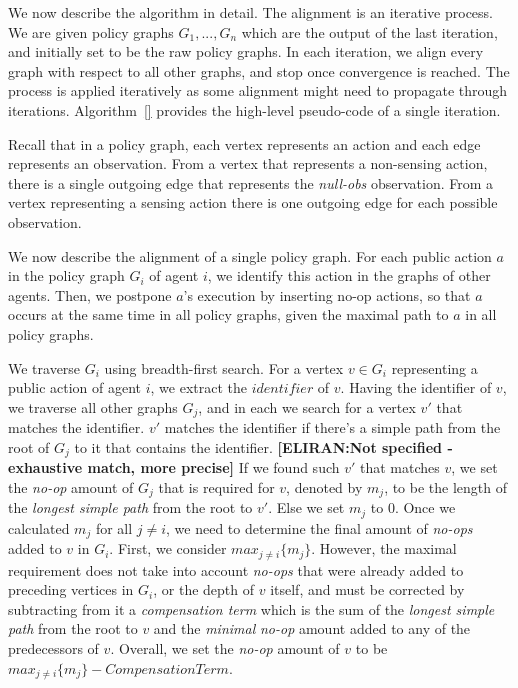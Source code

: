 \documentclass[letterpaper]{article} %
\theoremstyle{definition}
\newcommand{\eliran}[1]{\textbf{[\color{red}ELIRAN:#1]}}
\newcommand{\ronen}[1]{\textbf{[\color{blue}RONEN:#1]}}
\begin{document}
{We now describe the algorithm in detail.
The alignment is an iterative process. We are given policy graphs $G_1,...,G_n$ which are the output of the last iteration, and initially set to be the raw policy graphs. In each iteration, we align every graph with respect to all other graphs, and stop once convergence is reached. The process is applied iteratively as some alignment might need to propagate through iterations. Algorithm~\ref{} provides the high-level pseudo-code of a single iteration.

Recall that in a policy graph, each vertex represents an action and each edge represents an observation. From a vertex that represents a non-sensing action, there is a single outgoing edge that represents the \emph{null-obs} observation. From a vertex representing a sensing action there is one outgoing edge for each possible observation.

We now describe the alignment of a single policy graph. For each public action $a$ in the policy graph $G_i$ of agent $i$, we identify this action in the graphs of other agents.
Then, we postpone $a$'s execution by inserting no-op actions, so that $a$ occurs at the same time in all policy graphs, given the maximal path to $a$ in all policy graphs.

We traverse $G_i$ using breadth-first search. For a vertex $v\in G_i$ representing a public action of agent $i$, we extract the $identifier$ of $v$. Having the identifier of $v$, we traverse all other graphs $G_j$, and in each we search for a vertex $v'$ that matches the identifier. $v'$ matches the identifier if there's a simple path from the root of $G_j$ to it that contains the identifier.
\eliran{Not specified - exhaustive match, more precise}
If we found such $v'$ that matches $v$, we set the {\em no-op} amount of $G_j$ that is required for $v$, denoted by $m_j$, to be the length of the \emph{longest simple path} from the root to $v'$. Else we set $m_j$ to 0.
Once we calculated $m_j$ for all $j\neq i$, we need to determine the final amount of {\em no-ops} added to $v$ in $G_i$. First, we consider $max_{j\neq i}\{m_j\}$. However, the maximal requirement does not take into account {\em no-ops} that were already added to preceding vertices in $G_i$, or the depth of $v$ itself, and must be
corrected by subtracting from it a \emph{compensation term} which is the sum of the \emph{longest simple path} from the root to $v$ and the \emph{minimal} {\em no-op} amount added to any of the predecessors of $v$. Overall, we set the {\em no-op} amount of $v$ to be $max_{j\neq i}\{m_j\} - \mathit{CompensationTerm}$.

}
\end{document}
